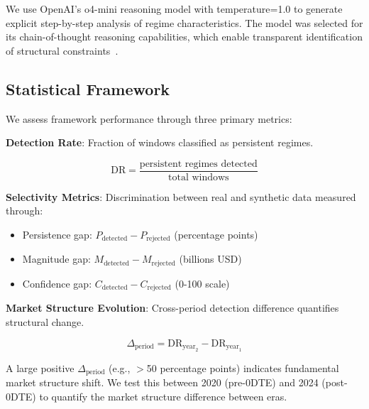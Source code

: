 We use OpenAI's o4-mini reasoning model with temperature=1.0 to generate explicit step-by-step analysis of regime characteristics. The model was selected for its chain-of-thought reasoning capabilities, which enable transparent identification of structural constraints~\cite{openai2024reasoning}.

\subsection{Statistical Framework}

We assess framework performance through three primary metrics:

\vspace{0.3cm}

\noindent\textbf{Detection Rate}: Fraction of windows classified as persistent regimes.

\begin{equation}
\text{DR} = \frac{\text{persistent regimes detected}}{\text{total windows}}
\end{equation}

\vspace{0.2cm}

\noindent\textbf{Selectivity Metrics}: Discrimination between real and synthetic data measured through:

\begin{itemize}
\item Persistence gap: $P_{\text{detected}} - P_{\text{rejected}}$ (percentage points)
\item Magnitude gap: $M_{\text{detected}} - M_{\text{rejected}}$ (billions USD)
\item Confidence gap: $C_{\text{detected}} - C_{\text{rejected}}$ (0-100 scale)
\end{itemize}

\vspace{0.2cm}

\noindent\textbf{Market Structure Evolution}: Cross-period detection difference quantifies structural change.

\begin{equation}
\Delta_{\text{period}} = \text{DR}_{\text{year}_2} - \text{DR}_{\text{year}_1}
\end{equation}

A large positive $\Delta_{\text{period}}$ (e.g., $>$50 percentage points) indicates fundamental market structure shift. We test this between 2020 (pre-0DTE) and 2024 (post-0DTE) to quantify the market structure difference between eras.
